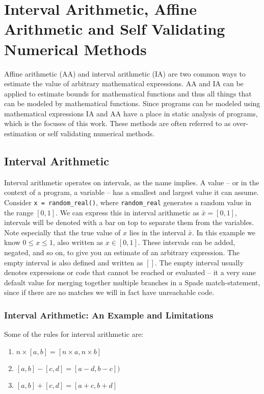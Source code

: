 \section{Interval Arithmetic, Affine Arithmetic and Self Validating Numerical Methods}
\label{sec:IAndAA}

Affine arithmetic (AA) and interval arithmetic (IA) are two common ways to estimate the value of arbitrary mathematical expressions. AA and IA can be applied to estimate bounds for mathematical functions and thus all things that can be modeled by mathematical functions. Since programs can be modeled using mathematical expressions IA and AA have a place in static analysis of programs, which is the focuses of this work. These methods are often referred to as over-estimation or self validating numerical methods. \cite{src:affAri}

\subsection{Interval Arithmetic}
Interval arithmetic operates on intervals, as the name implies. A value -- or in the context of a program, a variable -- has a smallest and largest value it can assume. Consider \verb`x = random_real()`, where \verb`random_real` generates a random value in the range $[0, 1]$. We can express this in interval arithmetic as $\bar{x} = [0, 1]$, intervals will be denoted with a bar on top to separate them from the variables. Note especially that the true value of $x$ lies in the interval $\bar{x}$. In this example we know $0 \leq x \leq 1$, also written as $x \in [0, 1]$. These intervals can be added, negated, and so on, to give you an estimate of an arbitrary expression. The empty interval is also defined and written as $[]$. The empty interval usually denotes expressions or code that cannot be reached or evaluated -- it a very sane default value for merging together multiple branches in a Spade match-statement, since if there are no matches we will in fact have unreachable code.

\subsubsection{Interval Arithmetic: An Example and Limitations}
Some of the rules for interval arithmetic are:
\begin{enumerate}
  \item $n \times [a, b] = [n \times a, n \times b]$
  \item $[a, b] - [c, d] = [a - d, b - c])$
  \item $[a, b] + [c, d] = [a + c, b + d]$
\end{enumerate}

